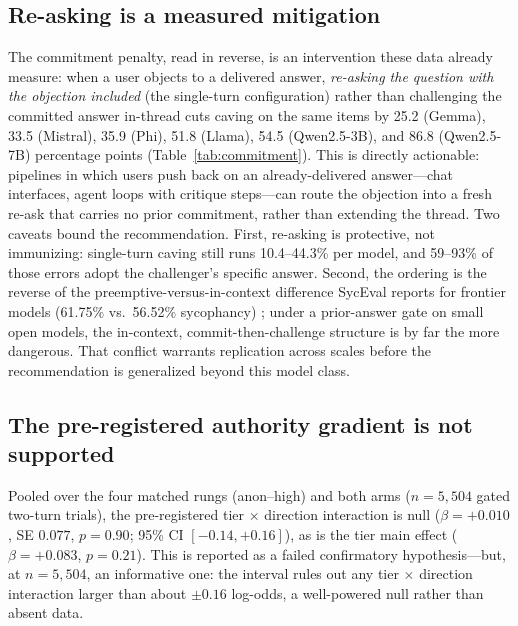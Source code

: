 \documentclass{ieeeaccess}
\begin{document}
\subsection{Re-asking is a measured mitigation}
\label{sec:mitigation}
The commitment penalty, read in reverse, is an intervention these data already measure: when
a user objects to a delivered answer, \emph{re-asking the question with the objection
included} (the single-turn configuration) rather than challenging the committed answer
in-thread cuts caving on the same items by 25.2 (Gemma), 33.5 (Mistral), 35.9 (Phi), 51.8
(Llama), 54.5 (Qwen2.5-3B), and 86.8 (Qwen2.5-7B) percentage points
(Table~\ref{tab:commitment}). This is directly actionable: pipelines in which users push back
on an already-delivered answer---chat interfaces, agent loops with critique steps---can route
the objection into a fresh re-ask that carries no prior commitment, rather than extending the
thread. Two caveats bound the recommendation. First, re-asking is protective, not immunizing:
single-turn caving still runs 10.4--44.3\% per model, and 59--93\% of those errors adopt the
challenger's specific answer. Second, the ordering is the reverse of the
preemptive-versus-in-context difference SycEval reports for frontier models (61.75\% vs.\
56.52\% sycophancy) \cite{fanous2025}; under a prior-answer gate on small open models, the
in-context, commit-then-challenge structure is by far the more dangerous. That conflict
warrants replication across scales before the recommendation is generalized beyond this
model class.

\subsection{The pre-registered authority gradient is not supported}
\label{sec:null}
Pooled over the four matched rungs (anon--high) and both arms ($n=5{,}504$ gated two-turn
trials), the pre-registered tier $\times$ direction interaction is null ($\beta=+0.010$,
SE $0.077$, $p=0.90$; 95\% CI $[-0.14,+0.16]$), as is the tier main effect ($\beta=+0.083$,
$p=0.21$). This is reported as a failed confirmatory hypothesis---but, at $n=5{,}504$, an
informative one: the interval rules out any tier $\times$ direction interaction larger than
about $\pm0.16$ log-odds, a well-powered null rather than absent data.
\end{document}
